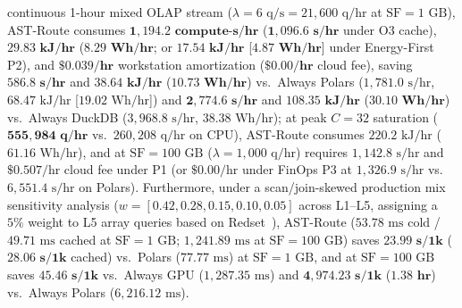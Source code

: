 \documentclass[10pt,a4paper]{article}
\begin{document}
\begin{enumerate}[leftmargin=1.5em,itemsep=0.8pt]
continuous 1-hour mixed OLAP stream ($\lambda=6\text{ q/s} = 21{,}600\text{ q/hr}$ at $\text{SF}=1\text{ GB}$), AST-Route consumes $\mathbf{1{,}194.2\text{ compute-s/hr}}$ ($\mathbf{1{,}096.6\text{ s/hr}}$ under O3 cache), $\mathbf{29.83\text{ kJ/hr}}$ ($\mathbf{8.29\text{ Wh/hr}}$; or $\mathbf{17.54\text{ kJ/hr}}$ [$\mathbf{4.87\text{ Wh/hr}}$] under Energy-First P2), and $\mathbf{\$0.039\text{/hr}}$ workstation amortization ($\mathbf{\$0.00\text{/hr}}$ cloud fee), saving $\mathbf{586.8\text{ s/hr}}$ and $\mathbf{38.64\text{ kJ/hr}}$ ($\mathbf{10.73\text{ Wh/hr}}$) vs.\ Always Polars ($1{,}781.0\text{ s/hr}$, $68.47\text{ kJ/hr}$ [$19.02\text{ Wh/hr}$]) and $\mathbf{2{,}774.6\text{ s/hr}}$ and $\mathbf{108.35\text{ kJ/hr}}$ ($\mathbf{30.10\text{ Wh/hr}}$) vs.\ Always DuckDB ($3{,}968.8\text{ s/hr}$, $38.38\text{ Wh/hr}$); at peak $C=32$ saturation ($\mathbf{555{,}984\text{ q/hr}}$ vs.\ $260{,}208\text{ q/hr}$ on CPU), AST-Route consumes $220.2\text{ kJ/hr}$ ($61.16\text{ Wh/hr}$), and at $\text{SF}=100\text{ GB}$ ($\lambda=1{,}000\text{ q/hr}$) requires $1{,}142.8\text{ s/hr}$ and $\$0.507\text{/hr}$ cloud fee under P1 (or $\$0.00\text{/hr}$ under FinOps P3 at $1{,}326.9\text{ s/hr}$ vs.\ $6{,}551.4\text{ s/hr}$ on Polars). Furthermore, under a scan/join-skewed production mix sensitivity analysis ($w = [0.42, 0.28, 0.15, 0.10, 0.05]$ across L1--L5, assigning a $5\%$ weight to L5 array queries based on Redset~\cite{vanrenen2024redset}), AST-Route ($53.78\text{ ms}$ cold / $49.71\text{ ms}$ cached at $\text{SF}=1\text{ GB}$; $1{,}241.89\text{ ms}$ at $\text{SF}=100\text{ GB}$) saves $\mathbf{23.99\text{ s}/1\text{k}}$ ($\mathbf{28.06\text{ s}/1\text{k}}$ cached) vs.\ Polars ($77.77\text{ ms}$) at $\text{SF}=1\text{ GB}$, and at $\text{SF}=100\text{ GB}$ saves $\mathbf{45.46\text{ s}/1\text{k}}$ vs.\ Always GPU ($1{,}287.35\text{ ms}$) and $\mathbf{4{,}974.23\text{ s}/1\text{k}}$ ($\mathbf{1.38\text{ hr}}$) vs.\ Always Polars ($6{,}216.12\text{ ms}$).

\end{enumerate}
\end{document}
